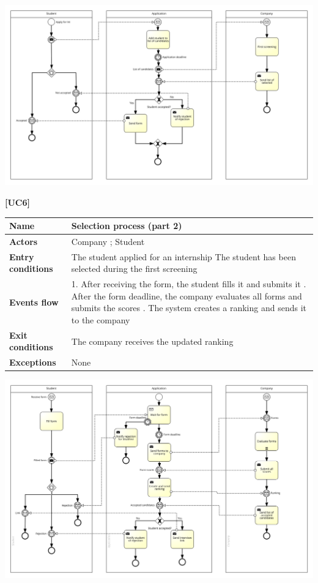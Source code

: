 \documentclass[11pt,twoside]{article}
\begin{document}
\begin{center}
\includegraphics[width=\textwidth]{Images/UC5}
\end{center}

\newpage

\large{\textbf{[UC6]}} \\
\begin{table}[H]
\begin{tabular}{| p{} | p{} |}
\hline
\textbf{Name}
& Selection process (part 2) \\
\hline
\textbf{Actors}
& Company ; Student \\
\hline
\textbf{Entry conditions}
& The student applied for an internship \newline
The student has been selected during the first screening \\
\hline
\textbf{Events flow}
& 1. After receiving the form, the student fills it and submits it \newline
2. After the form deadline, the company evaluates all forms and submits the scores \newline
3. The system creates a ranking and sends it to the company \\
\hline
\textbf{Exit conditions}
& The company receives the updated ranking \\
\hline
\textbf{Exceptions}
& None \\
\hline
\end{tabular}
\end{table}

\begin{center}
\includegraphics[width=\textwidth]{Images/UC6}
\end{center}
\end{document}
